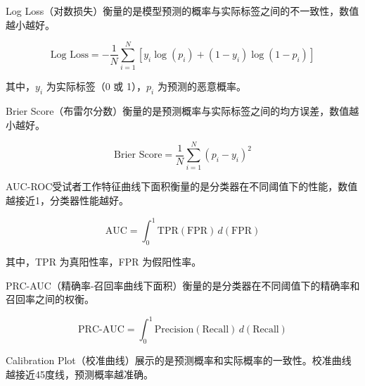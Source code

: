 \documentclass[conference]{IEEEtran}
\begin{document}
Log Loss（对数损失）衡量的是模型预测的概率与实际标签之间的不一致性，数值越小越好。

\begin{equation}
\text{Log Loss} = -\frac{1}{N} \sum_{i=1}^{N} [y_i \log(p_i) + (1 - y_i) \log(1 - p_i)]
\end{equation}

其中，$y_i$ 为实际标签（0 或 1），$p_i$ 为预测的恶意概率。

Brier Score（布雷尔分数）衡量的是预测概率与实际标签之间的均方误差，数值越小越好。

\begin{equation}
\text{Brier Score} = \frac{1}{N} \sum_{i=1}^{N} (p_i - y_i)^2
\end{equation}

AUC-ROC受试者工作特征曲线下面积衡量的是分类器在不同阈值下的性能，数值越接近1，分类器性能越好。

\begin{equation}
\text{AUC} = \int_0^1 \text{TPR}(\text{FPR}) \, d(\text{FPR})
\end{equation}

其中，TPR 为真阳性率，FPR 为假阳性率。

PRC-AUC（精确率-召回率曲线下面积）衡量的是分类器在不同阈值下的精确率和召回率之间的权衡。

\begin{equation}
\text{PRC-AUC} = \int_0^1 \text{Precision}(\text{Recall}) \, d(\text{Recall})
\end{equation}

Calibration Plot（校准曲线）展示的是预测概率和实际概率的一致性。校准曲线越接近45度线，预测概率越准确。
\end{document}
